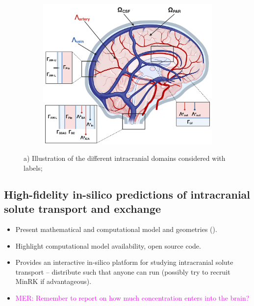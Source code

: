\documentclass[fleqn,10pt]{wlscirep}
\newcommand{\mer}[1]{\textcolor{magenta}{#1}}
\begin{document}
\begin{figure}
     \begin{subfigure}[b]{0.45\textwidth}
         \centering
         \includegraphics[width=\textwidth]{figures/Brain-PVS-callouts.png}
     \end{subfigure}
     \hfill
     \caption{a) Illustration of the different intracranial domains
       considered with labels;}
     \label{fig:intracranial_domains}
\end{figure}


\subsection*{High-fidelity in-silico predictions of intracranial solute transport and exchange}

\begin{itemize}
\item
  Present mathematical and computational model and geometries (). 
\item
  Highlight computational model availability, open source code.
\item
  Provides an interactive in-silico platform for studying intracranial solute transport -- distribute such that anyone can run (possibly try to recruit MinRK if advantageous).
\item
  \mer{MER: Remember to report on how much concentration enters into the brain?}
\end{itemize}
\end{document}
